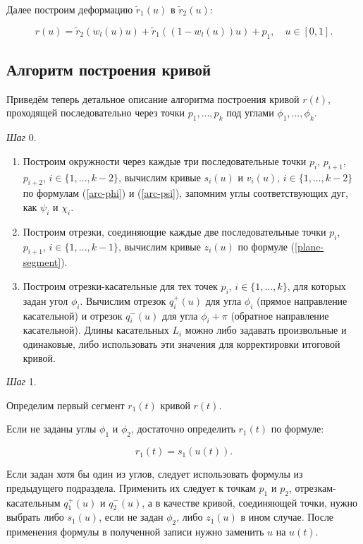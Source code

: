 Далее построим деформацию $\tilde r_1(u)$ в $\tilde r_2(u)$:

\begin{equation}
r(u)=\tilde r_2(w_l(u)u)+\tilde r_1((1-w_l(u))u)+p_1, \quad u \in [0,1].
\label{plane-result-deformed-curve}
\end{equation}

\subsection*{Алгоритм построения кривой}

Приведём теперь детальное описание алгоритма построения кривой $r(t)$, проходящей последовательно через точки
$p_1,\dots,p_k$ под углами $\phi_1,\dots,\phi_k$.

\bigskip
\textit{Шаг} 0.

\begin{enumerate}
\item Построим окружности через каждые три последовательные точки $p_i$, $p_{i+1}$, $p_{i+2}$, $i \in \{1,\dots,k-2\}$,
вычислим кривые $s_i(u)$ и $v_i(u)$, $i \in \{1,\dots,k-2\}$ по формулам (\ref{arc-phi}) и (\ref{arc-psi}), запомним
углы соответствующих дуг, как $\psi_i$ и $\chi_i$.
\item Построим отрезки, соединяющие каждые две последовательные точки $p_i$, $p_{i+1}$, $i \in \{1,\dots,k-1\}$,
вычислим кривые $z_i(u)$ по формуле (\ref{plane-segment}).
\item Построим отрезки-касательные для тех точек $p_i$, $i \in \{1,\dots,k\}$, для которых задан угол $\phi_i$.
Вычислим отрезок $q_i^+(u)$ для угла $\phi_i$ (прямое направление касательной) и отрезок $q_i^-(u)$ для угла
$\phi_i+\pi$ (обратное направление касательной). Длины касательных $L_i$ можно либо задавать произвольные и одинаковые,
либо использовать эти значения для корректировки итоговой кривой.
\end{enumerate}

\bigskip
\textit{Шаг} 1.

Определим первый сегмент $r_1(t)$ кривой $r(t)$.

Если не заданы углы $\phi_1$ и $\phi_2$, достаточно определить $r_1(t)$ по формуле:

$$
r_1(t)=s_1(u(t)).
$$

Если задан хотя бы один из углов, следует использовать формулы из предыдущего подраздела. Применить их следует к
точкам $p_1$ и $p_2$, отрезкам-касательным $q_1^+(u)$ и $q_2^-(u)$, а в качестве кривой, соединяющей точки, нужно
выбрать либо $s_1(u)$, если не задан $\phi_2$, либо $z_1(u)$ в ином случае. После применения формулы в полученной
записи нужно заменить $u$ на $u(t)$.

